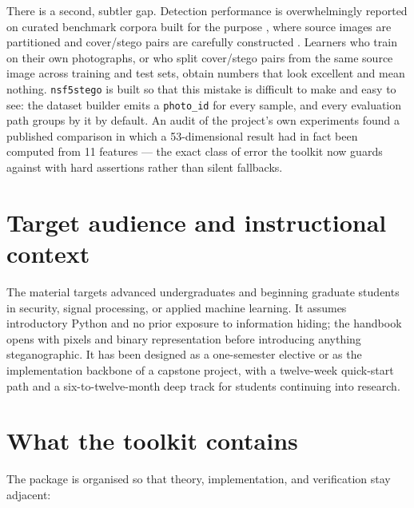 \documentclass[11pt,a4paper]{article}
\begin{document}
There is a second, subtler gap. Detection performance is overwhelmingly reported
on curated benchmark corpora built for the purpose \citep{bas2011boss}, where
source images are partitioned and cover/stego pairs are carefully constructed
\citep{pevny2010spam,fridrich2012rich}. Learners who train on their own
photographs, or who split cover/stego pairs from the same source image across
training and test sets, obtain numbers that look excellent and mean nothing.
\texttt{nsf5stego} is built so that this mistake is difficult to make and easy to
see: the dataset builder emits a \texttt{photo\_id} for every sample, and every
evaluation path groups by it by default. An audit of the project's own
experiments found a published comparison in which a 53-dimensional result had in
fact been computed from 11 features --- the exact class of error the toolkit now
guards against with hard assertions rather than silent fallbacks.

\section*{Target audience and instructional context}

The material targets advanced undergraduates and beginning graduate students in
security, signal processing, or applied machine learning. It assumes introductory
Python and no prior exposure to information hiding; the handbook opens with pixels
and binary representation before introducing anything steganographic. It has been
designed as a one-semester elective or as the implementation backbone of a
capstone project, with a twelve-week quick-start path and a six-to-twelve-month
deep track for students continuing into research.

\section*{What the toolkit contains}

The package is organised so that theory, implementation, and verification stay
adjacent:
\end{document}
